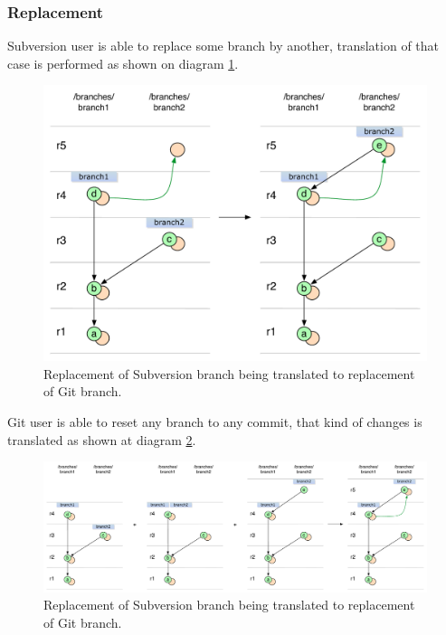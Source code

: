 \subsubsection{Replacement}

Subversion user is able to replace some branch by another, translation of that case is performed as shown on diagram \ref{branch_replacement_svn_to_git}.
\begin{figure}[!h]
\centering
\renewcommand{\figurename}{Diagram}
\includegraphics[width=\linewidth]{img/diagrams/branch_replacement_svn_to_git.pdf}
\caption{Replacement of Subversion branch being translated to replacement of Git branch.}
\label{branch_replacement_svn_to_git}
\end{figure}

Git user is able to reset any branch to any commit, that kind of changes is translated as shown at diagram \ref{branch_replacement_git_to_svn}.
\begin{figure}[!h]
\centering
\renewcommand{\figurename}{Diagram}
\includegraphics[width=\linewidth]{img/diagrams/branch_replacement_git_to_svn.pdf}
\caption{Replacement of Subversion branch being translated to replacement of Git branch.}
\label{branch_replacement_git_to_svn}
\end{figure}